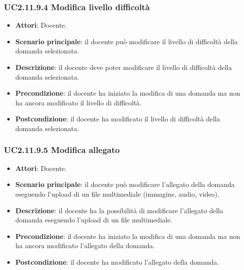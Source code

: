 \subsubsection{UC2.11.9.4 Modifica livello difficoltà}
\begin{itemize}
\item \textbf{Attori}: Docente.
\item \textbf{Scenario principale}: il docente può modificare il livello di difficoltà della domanda selezionata.
\item \textbf{Descrizione}: il docente deve poter modificare il livello di difficoltà della domanda selezionata.
\item \textbf{Precondizione}: il docente ha iniziato la modifica di una domanda ma non ha ancora modificato il livello di difficoltà.
\item \textbf{Postcondizione}: il docente ha modificato il livello di difficoltà della domanda selezionata.
\end{itemize}
\subsubsection{UC2.11.9.5 Modifica allegato}
\begin{itemize}
\item \textbf{Attori}: Docente.
\item \textbf{Scenario principale}: il docente può modificare l'allegato della domanda eseguendo l'upload di un file multimediale (immagine, audio, video).
\item \textbf{Descrizione}: il docente ha la possibilità di modificare l'allegato della domanda eseguendo l'upload di un file multimediale.
\item \textbf{Precondizione}: il docente ha iniziato la modifica di una domanda ma non ha ancora modificato l'allegato della domanda.
\item \textbf{Postcondizione}: il docente ha modificato l'allegato della domanda.
\end{itemize}
